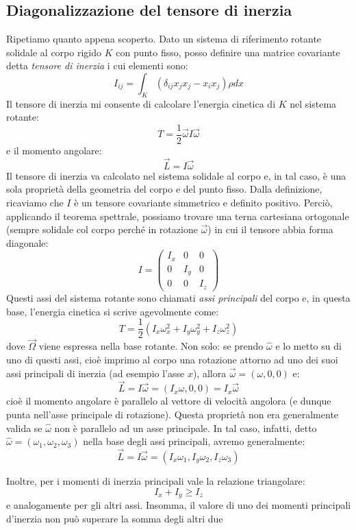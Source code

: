 \documentclass[a4paper,openany]{article}
\begin{document}
	\subsection{Diagonalizzazione del tensore di inerzia}
	Ripetiamo quanto appena scoperto. Dato un sistema di riferimento rotante solidale al corpo rigido $K$ con punto fisso, posso definire una matrice covariante detta \textit{tensore di inerzia} i cui elementi sono:
	$$
	I_{ij} = \int_{K}(\delta_{ij}x_j x_j - x_i x_j)\rho dx
	$$
	Il tensore di inerzia mi consente di calcolare l'energia cinetica di $K$ nel sistema rotante:
	$$
	T = \dfrac{1}{2}\vec{\omega}I\vec{\omega}
	$$
	e il momento angolare:
	$$
	\vec{L} = I\vec{\omega}
	$$
	Il tensore di inerzia va calcolato nel sistema solidale al corpo e, in tal caso, è una sola proprietà della geometria del corpo e del punto fisso.
	Dalla definizione, ricaviamo che $I$ è un tensore covariante simmetrico e definito positivo. Perciò, applicando il teorema spettrale, possiamo trovare una terna cartesiana ortogonale (sempre solidale col corpo perché in rotazione $\vec{\omega}$) in cui il tensore abbia forma diagonale:
	\begin{equation}\label{key}
		I =
		\begin{pmatrix}
			I_{x} & 0 & 0 \\
			0 & I_{y} & 0 \\
			0 & 0 & I_{z} 
		\end{pmatrix}
	\end{equation}
	Questi assi del sistema rotante sono chiamati \textit{assi principali} del corpo e, in questa base, l'energia cinetica si scrive agevolmente come:
	$$
	T = \dfrac{1}{2}(I_{x}\omega_{x}^{2}+I_{y}\omega_{y}^{2}+I_{z}\omega_{z}^{2})
	$$ 
	dove $\vec{\Omega}$ viene espressa nella base rotante. Non solo: se prendo $\hat{\omega}$ e lo metto su di uno di questi assi, cioè imprimo al corpo una rotazione attorno ad uno dei suoi assi principali di inerzia (ad esempio l'asse $x$), allora $\vec{\omega} = (\omega,0,0)$ e:
	$$
	\vec{L} = I\vec{\omega} = (I_{x}\omega,0,0) = I_{x}\vec\omega
	$$
	cioè il momento angolare è parallelo al vettore di velocità angolora (e dunque punta nell'asse principale di rotazione). Questa proprietà non era generalmente valida se $\hat{\omega}$ non è parallelo ad un asse principale. In tal caso, infatti, detto $\hat{\omega} = (\omega_1, \omega_2, \omega_3)$ nella base degli assi principali, avremo generalmente:
	$$
	\vec{L} = I\vec{\omega} = (I_{x}\omega_1,I_y \omega_2, I_z \omega_3)
	$$
	
	Inoltre, per i momenti di inerzia principali vale la relazione triangolare:
	$$
	I_x+I_y \geq I_z
	$$
	e analogamente per gli altri assi. Insomma, il valore di uno dei momenti principali d'inerzia non può superare la somma degli altri due
\end{document}
